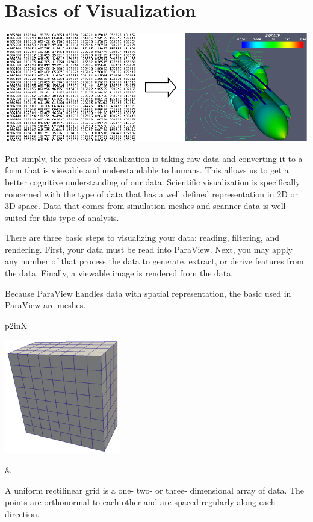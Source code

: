 \section{Basics of Visualization}

\begin{inlinefig}
  \includegraphics[width=\linewidth]{images/BasicsOfVisualization}
\end{inlinefig}

Put simply, the process of visualization is taking raw data and converting
it to a form that is viewable and understandable to humans.  This allows us
to get a better cognitive understanding of our data.  Scientific
visualization is specifically concerned with the type of data that has a
well defined representation in 2D or 3D space.  Data that comes from
simulation meshes and scanner data is well suited for this type of
analysis.

There are three basic steps to visualizing your data: reading, filtering,
and rendering.  First, your data must be read into ParaView.  Next, you may
apply any number of  that process the data to generate,
extract, or derive features from the data.  Finally, a viewable image is
rendered from the data.

Because ParaView handles data with spatial representation, the basic
 used in ParaView are meshes.

\noindent
\begin{tabularx}{\linewidth}{p{2in}X}
  \parbox{2in}{\includegraphics[width=2in]{images/ImageData}} &
  \begin{minipage}{\linewidth}

    A uniform rectilinear grid is a one- two- or three- dimensional array of
    data.  The points are orthonormal to each other and are spaced regularly
    along each direction.
  \end{minipage}
\end{tabularx}

